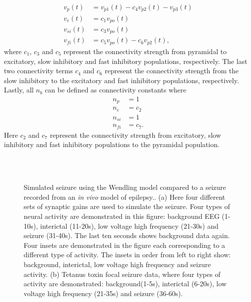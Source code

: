 \begin{align}
v_{p}(t) &= v_{p1}(t)-c_{4}v_{p2}(t)-v_{p3}(t)\\
v_{e}(t) &= c_{1}v_{po}(t)\\
v_{si}(t) &= c_{3}v_{po}(t)\\
v_{fi}(t) &= c_{5}v_{po}(t)-c_{6}v_{p2}(t),
\end{align} where $c_{1}$, $c_{3}$ and $c_{5}$ represent the connectivity strength from pyramidal to excitatory, slow inhibitory and fast inhibitory populations, respectively. The last two connectivity terms $c_{4}$ and $c_{6}$ represent the connectivity strength from the slow inhibitory to the excitatory and fast inhibitory populations, respectively. Lastly, all $n_{b}$ can be defined as connectivity constants where\begin{align}%
n_{p} &=1\\
n_{e} &=c_{2}\\
n_{si} &=1\\
n_{fi} &=c_{7}.
\end{align} Here $c_{2}$ and $c_7$ represent the connectivity strength from excitatory, slow inhibitory and fast inhibitory populations to the pyramidal population.
\begin{figure}%
	\centering
{}\\
\\
	\caption{Simulated seizure using the Wendling model compared to a seizure recorded from an \textsl{in vivo} model of epilepsy.. (a) Here four different sets of synaptic gains are used to simulate the seizure. Four types of neural activity are demonstrated in this figure: background EEG (1-10s), interictal (11-20s), low voltage high frequency (21-30s) and seizure (31-40s). The last ten seconds shows background data again. Four insets are demonstrated in the figure each corresponding to a different type of activity. The insets in order from left to right show: background, interictal, low voltage high frequency and seizure activity. (b) Tetanus toxin focal seizure data, where four types of activity are demonstrated: background(1-5s), interictal (6-20s), low voltage high frequency (21-35s) and seizure (36-60s).}
	\label{fig: SeizureSim}
\end{figure}%
